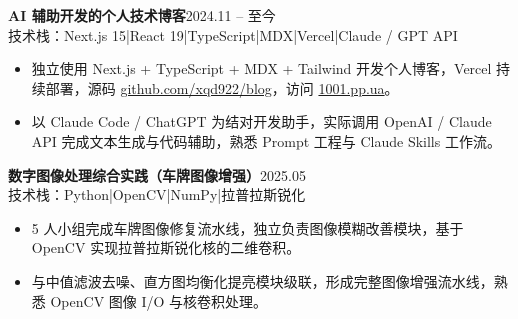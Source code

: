 \documentclass[10pt,a4paper]{article}
\newcommand{\projectblock}[3]{%
    {\bfseries\color{darktext}#1}\hfill{\color{graytext}#2}\\%
    {\small\color{graytext}#3}%
    \vspace{0.2em}%
}
\begin{document}
\vspace{0.15em}

\projectblock{AI 辅助开发的个人技术博客}{2024.11 -- 至今}{技术栈：Next.js 15\hspace{0.3em}|\hspace{0.3em}React 19\hspace{0.3em}|\hspace{0.3em}TypeScript\hspace{0.3em}|\hspace{0.3em}MDX\hspace{0.3em}|\hspace{0.3em}Vercel\hspace{0.3em}|\hspace{0.3em}Claude / GPT API}

\begin{itemize}[leftmargin=1.5em, itemsep=2pt, parsep=0pt, topsep=2pt]
    \item 独立使用 Next.js + TypeScript + MDX + Tailwind 开发个人博客，Vercel 持续部署，源码 \href{https://github.com/xqd922/blog}{github.com/xqd922/blog}，访问 \href{https://1001.pp.ua}{1001.pp.ua}。
    \item 以 Claude Code / ChatGPT 为结对开发助手，实际调用 OpenAI / Claude API 完成文本生成与代码辅助，熟悉 Prompt 工程与 Claude Skills 工作流。
\end{itemize}

\vspace{0.15em}

\projectblock{数字图像处理综合实践（车牌图像增强）}{2025.05}{技术栈：Python\hspace{0.3em}|\hspace{0.3em}OpenCV\hspace{0.3em}|\hspace{0.3em}NumPy\hspace{0.3em}|\hspace{0.3em}拉普拉斯锐化}

\begin{itemize}[leftmargin=1.5em, itemsep=2pt, parsep=0pt, topsep=2pt]
    \item 5 人小组完成车牌图像修复流水线，独立负责图像模糊改善模块，基于 OpenCV 实现拉普拉斯锐化核的二维卷积。
    \item 与中值滤波去噪、直方图均衡化提亮模块级联，形成完整图像增强流水线，熟悉 OpenCV 图像 I/O 与核卷积处理。
\end{itemize}

\vspace{0.15em}
\end{document}
